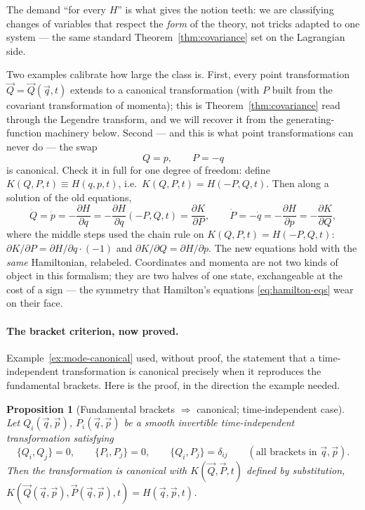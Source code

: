 \documentclass[11pt]{article}
\theoremstyle{plain}
\newtheorem{proposition}[theorem]{Proposition}
\theoremstyle{definition}
\theoremstyle{remark}
\newcommand{\pd}[2]{\frac{\partial #1}{\partial #2}}
\newcommand{\vq}{\vec{q}}
\newcommand{\vp}{\vec{p}}
\newcommand{\vQ}{\vec{Q}}
\newcommand{\vP}{\vec{P}}
\begin{document}
The demand ``for every $H$'' is what gives the notion teeth: we are
classifying changes of variables that respect the \emph{form} of the
theory, not tricks adapted to one system --- the same standard
Theorem~\ref{thm:covariance} set on the Lagrangian side.

Two examples calibrate how large the class is. First, every point
transformation $\vQ = \vQ(\vq, t)$ extends to a canonical
transformation (with $P$ built from the covariant transformation of
momenta); this is Theorem~\ref{thm:covariance} read through the
Legendre transform, and we will recover it from the generating-function
machinery below. Second --- and this is what point transformations can
never do --- the swap
\begin{equation}
  Q = p, \qquad P = -q
  \label{eq:ct-swap}
\end{equation}
is canonical. Check it in full for one degree of freedom: define
$K(Q, P, t) \equiv H(q, p, t)$, i.e.\ $K(Q,P,t) = H(-P, Q, t)$. Then
along a solution of the old equations,
\begin{equation}
  \dot Q = \dot p = -\pd{H}{q}
  = -\pd{H}{q}(-P, Q, t)
  = \pd{K}{P},
  \qquad
  \dot P = -\dot q = -\pd{H}{p}
  = -\pd{K}{Q} ,
\end{equation}
where the middle steps used the chain rule on $K(Q,P,t) = H(-P,Q,t)$:
$\partial K/\partial P = \partial H/\partial q \cdot (-1)$ and
$\partial K/\partial Q = \partial H/\partial p$. The new equations hold
with the \emph{same} Hamiltonian, relabeled. Coordinates and momenta
are not two kinds of object in this formalism; they are two halves of
one state, exchangeable at the cost of a sign --- the symmetry that
Hamilton's equations \eqref{eq:hamilton-eqs} wear on their face.

\paragraph{The bracket criterion, now proved.}
Example~\ref{ex:mode-canonical} used, without proof, the statement
that a time-independent transformation is canonical precisely when it
reproduces the fundamental brackets. Here is the proof, in the
direction the example needed.

\begin{proposition}[Fundamental brackets $\Rightarrow$ canonical;
time-independent case]
\label{prop:bracket-canonical}
Let $Q_i(\vq,\vp)$, $P_i(\vq,\vp)$ be a smooth invertible
time-independent transformation satisfying
\begin{equation}
  \{Q_i, Q_j\} = 0, \qquad
  \{P_i, P_j\} = 0, \qquad
  \{Q_i, P_j\} = \delta_{ij}
  \qquad (\text{all brackets in } \vq, \vp).
  \label{eq:fundamental-brackets}
\end{equation}
Then the transformation is canonical with $K(\vQ, \vP, t)$ defined by
substitution, $K(\vQ(\vq,\vp), \vP(\vq,\vp), t) = H(\vq, \vp, t)$.
\end{proposition}
\end{document}
